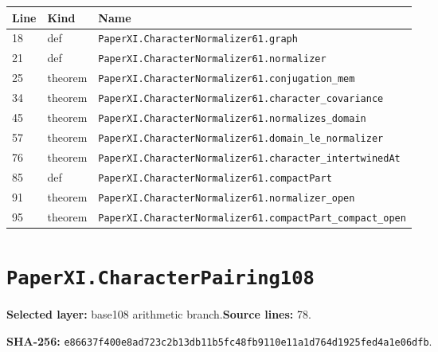 \documentclass[10pt,oneside]{book}
\begin{document}
\begin{longtable}{@{}p{}p{}p{}@{}}\toprule Line&Kind&Name\\\midrule\endhead

18&def&\nolinkurl{PaperXI.CharacterNormalizer61.graph}\\

21&def&\nolinkurl{PaperXI.CharacterNormalizer61.normalizer}\\

25&theorem&\nolinkurl{PaperXI.CharacterNormalizer61.conjugation_mem}\\

34&theorem&\nolinkurl{PaperXI.CharacterNormalizer61.character_covariance}\\

45&theorem&\nolinkurl{PaperXI.CharacterNormalizer61.normalizes_domain}\\

57&theorem&\nolinkurl{PaperXI.CharacterNormalizer61.domain_le_normalizer}\\

76&theorem&\nolinkurl{PaperXI.CharacterNormalizer61.character_intertwinedAt}\\

85&def&\nolinkurl{PaperXI.CharacterNormalizer61.compactPart}\\

91&theorem&\nolinkurl{PaperXI.CharacterNormalizer61.normalizer_open}\\

95&theorem&\nolinkurl{PaperXI.CharacterNormalizer61.compactPart_compact_open}\\

\bottomrule\end{longtable}

\section{\texorpdfstring{\nolinkurl{PaperXI.CharacterPairing108}}{PaperXI.CharacterPairing108}}\label{module:PaperXI.CharacterPairing108}

\textbf{Selected layer:} base108 arithmetic branch.\quad\textbf{Source lines:} 78.\par\textbf{SHA-256:} {\scriptsize\nolinkurl{e86637f400e8ad723c2b13db11b5fc48fb9110e11a1d764d1925fed4a1e06dfb}}.

\end{document}
